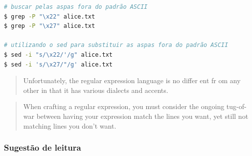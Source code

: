 \begin{frame}
\framebreak

\begin{lstlisting}[language=bash, label=lst-grep-07, caption={Bucando aspas fora do padrão ASCII.}, postbreak=\mbox{$\hookrightarrow$\space}, basicstyle=\fontsize{8}{10}\selectfont\ttfamily]
# buscar pelas aspas fora do padrão ASCII
$ grep -P "\x22" alice.txt 
$ grep -P "\x27" alice.txt 

# utilizando o sed para substituir as aspas fora do padrão ASCII
$ sed -i "s/\x22/'/g" alice.txt 
$ sed -i 's/\x27/"/g' alice.txt 
\end{lstlisting}

\framebreak

\begin{quote}
Unfortunately, the regular expression language is no differ ent fr om any other in
that it has various dialects and accents. \cite{friedl_mastering_2006}
\end{quote}
\vspace{3ex}

\begin{quote}
When crafting a regular expression, you must consider the ongoing tug-of-war between having your expression
match the lines you want, yet still not matching lines you don’t want. \cite{friedl_mastering_2006}
\end{quote}


\end{frame}

\begin{frame}
\frametitle{Sugestão de leitura}

\vspace{2ex}

\vspace{2ex}


\end{frame}
